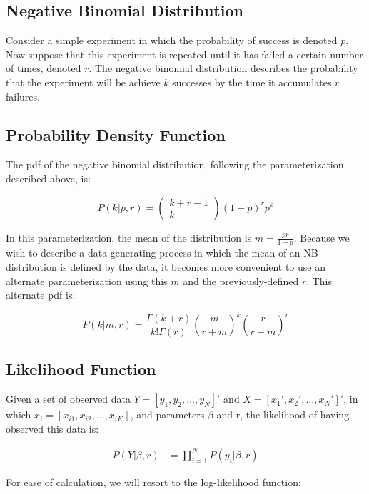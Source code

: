 \documentclass[12pt]{article}
\begin{document}
	\subsection{Negative Binomial Distribution}
	Consider a simple experiment in which the probability of success is denoted $p$. Now suppose that this experiment is repeated until it has failed a certain number of times, denoted $r$. The negative binomial distribution describes the probability that the experiment will be achieve $k$ successes by the time it accumulates $r$ failures.
	
	\subsection{Probability Density Function}
	The pdf of the negative binomial distribution, following the parameterization described above, is:
	
	\begin{equation}
	P(k|p,r) = \begin{pmatrix}k+r-1\\k\end{pmatrix}(1-p)^rp^k
	\end{equation}
	
	In this parameterization, the mean of the distribution is $m = \frac{pr}{1-p}$. Because we wish to describe a data-generating process in which the mean of an NB distribution is defined by the data, it becomes more convenient to use an alternate parameterization using this $m$ and the previously-defined $r$. This alternate pdf is:
	
	\begin{equation}
	P(k|m, r) = \frac{\Gamma(k+r)}{k!\Gamma(r)}\left(\frac{m}{r+m}\right)^k\left(\frac{r}{r+m}\right)^r
	\end{equation}
	
	\subsection{Likelihood Function}
	Given a set of observed data $Y = [y_1, y_2, \dots, y_N]'$ and $X = [x_1', x_2', \dots, x_N']'$, in which $x_i = [x_{i1}, x_{i2}, \dots, x_{iK}]$, and parameters $\beta$ and r, the likelihood of having observed this data is:
	
	\begin{align}
	P(Y|\beta, r) &= \prod_{i = 1}^{N} P(y_i|\beta, r)
	\end{align}
	
	For ease of calculation, we will resort to the log-likelihood function:
	
\end{document}
